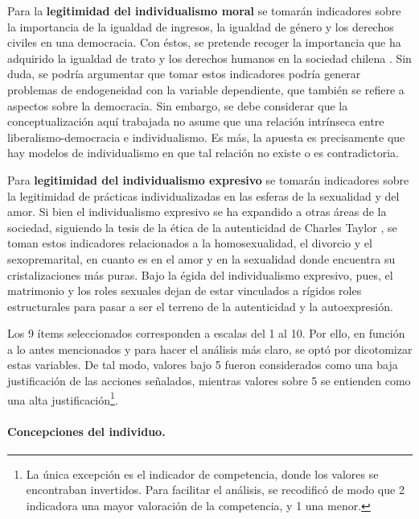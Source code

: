 \documentclass[12pt,twoside]{templates/facsothesis}
\begin{document}
\FloatBarrier

Para la \textbf{legitimidad del individualismo moral} se tomarán indicadores sobre la importancia de la igualdad de ingresos, la igualdad de género y los derechos civiles en una democracia. Con éstos, se pretende recoger la importancia que ha adquirido la igualdad de trato y los derechos humanos en la sociedad chilena \citep{araujo2012, araujo2020a}. Sin duda, se podría argumentar que tomar estos indicadores podría generar problemas de endogeneidad con la variable dependiente, que también se refiere a aspectos sobre la democracia. Sin embargo, se debe considerar que la conceptualización aquí trabajada no asume que una relación intrínseca entre liberalismo-democracia e individualismo. Es más, la apuesta es precisamente que hay modelos de individualismo en que tal relación no existe o es contradictoria.

Para \textbf{legitimidad del individualismo expresivo} se tomarán indicadores sobre la legitimidad de prácticas individualizadas en las esferas de la sexualidad y del amor. Si bien el individualismo expresivo se ha expandido a otras áreas de la sociedad, siguiendo la tesis de la ética de la autenticidad de Charles Taylor \citep{gauthier2021}, se toman estos indicadores relacionados a la homosexualidad, el divorcio y el sexopremarital, en cuanto es en el amor y en la sexualidad donde encuentra su cristalizaciones más puras. Bajo la égida del individualismo expresivo, pues, el matrimonio y los roles sexuales dejan de estar vinculados a rígidos roles estructurales para pasar a ser el terreno de la autenticidad y la autoexpresión.

Los 9 ítems seleccionados corresponden a escalas del 1 al 10. Por ello, en función a lo antes mencionados y para hacer el análisis más claro, se optó por dicotomizar estas variables. De tal modo, valores bajo 5 fueron considerados como una baja justificación de las acciones señalados, mientras valores sobre 5 se entienden como una alta justificación\footnote{La única excepción es el indicador de competencia, donde los valores se encontraban invertidos. Para facilitar el análisis, se recodificó de modo que 2 indicadora una mayor valoración de la competencia, y 1 una menor.}.

\hypertarget{concepciones-del-individuo.}{%
\paragraph{Concepciones del individuo.}\label{concepciones-del-individuo.}}
\end{document}
